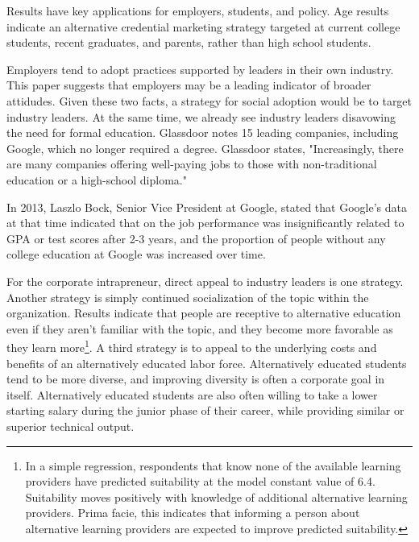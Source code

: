 \documentclass[AER]{./aea-latex-templates/AEA}
\begin{document}
        
        Results have key applications for employers, students, and policy.
        Age results indicate an alternative credential marketing strategy targeted at
        current college students, recent graduates, and parents, rather than high school students.
        
        Employers tend to adopt practices supported by leaders in their own industry.
        This paper suggests that employers may be a leading indicator of broader attidudes.
        Given these two facts, a strategy for social adoption would be to target industry leaders.
        At the same time, we already see industry leaders disavowing the need for formal education.
        Glassdoor notes 15 leading companies, including Google, which no longer required a degree\cite{glassdoor_2018}. Glassdoor
        states, "Increasingly, there are many companies offering well-paying jobs
        to those with non-traditional education or a high-school diploma."
        
        In 2013, Laszlo Bock, Senior Vice President at Google, stated that Google’s data at that time indicated
        that on the job performance was insignificantly related to GPA or test
        scores after 2-3 years, and the proportion of people without any college
        education at Google was increased over time\cite{bryant_2013}.
        
        For the corporate intrapreneur, direct appeal to industry leaders is one strategy.
        Another strategy is simply continued socialization of the topic within the organization.
        Results indicate that people are receptive to alternative education even if they aren’t
        familiar with the topic, and they become more favorable as they learn
        more\footnote{In a simple regression, respondents that know none of the available learning providers have predicted suitability at the model constant value of 6.4.
        Suitability moves positively with knowledge of additional alternative learning providers.
        Prima facie, this indicates that informing a person about alternative learning providers are expected to improve predicted suitability.}.
        A third strategy is to appeal to the underlying costs and benefits of an alternatively educated labor force.
        Alternatively educated students tend to be more diverse\cite{florentine_2018}, and improving diversity is often a corporate goal in itself.
        Alternatively educated students are also often willing to take a lower starting salary during the junior phase of their career, while providing similar or superior technical output.
        
\end{document}
